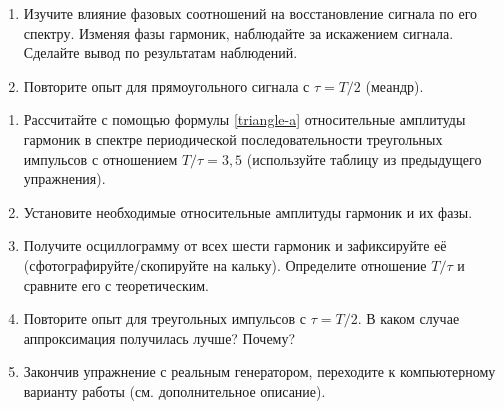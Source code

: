 \begin{lab:task}
\begin{enumerate}
\item Изучите влияние фазовых соотношений на восстановление сигнала по
его спектру. Изменяя фазы гармоник, наблюдайте за искажением сигнала.
Сделайте вывод по результатам наблюдений.

\item Повторите опыт для прямоугольного сигнала с $\tau=T/2$ (меандр).

\end{enumerate}

\begin{enumerate}
	\item Рассчитайте с помощью формулы \eqref{triangle-a} относительные
амплитуды гармоник в спектре периодической последовательности треугольных
импульсов с отношением $T/\tau=3,5$ (используйте таблицу из предыдущего
упражнения).
	\item Установите необходимые относительные амплитуды гармоник и их фазы.
	\item Получите осциллограмму от всех шести гармоник и
зафиксируйте её (сфотографируйте/скопируйте на кальку).
Определите отношение $T/\tau$ и сравните его с теоретическим.
        \item Повторите опыт для треугольных импульсов с $\tau=T/2$. В каком
случае аппроксимация получилась лучше? Почему?
	\item Закончив упражнение с реальным генератором, переходите к компьютерному
варианту работы (см. дополнительное описание).


\end{enumerate}

\end{lab:task}





